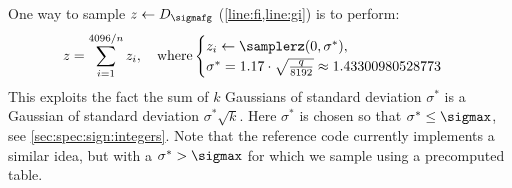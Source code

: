 \begin{algorithm}%
  \caption{$\ntrugen(\phi, q)$ \hfill}\label{alg:ntrugen}
 \begin{algorithmic}[1]
  \label{step:genfg}
  \label{line:sigmafg} 
  \EndFor
  \label{line:fi}
  \label{line:gi}
  \label{step:ntt} 
  \Restart
  \EndIf
  \label{line:gamma}
  \Restart
  \EndIf\label{step:endgenfg}
   
  \label{line:botntrusolve}
  \Restart\label{line:botntrusolverestart}
  \EndIf
  \end{algorithmic}
\end{algorithm}

\newcommand{\sigmastar}{{\sigma^*}}
One way to sample $z \gets D_{\sigmafg}$ (\cref{line:fi,line:gi}) is to perform:
\begin{equation}\label{eq:sigmastar}
z = \sum_{i = 1}^{4096/n} z_i, \quad \text{where} \begin{cases}
z_i \gets \samplerz(0, \sigmastar),\\
\sigmastar = 1.17 \cdot \sqrt\frac{q}{8192} \approx 1.43300980528773
\end{cases}
\end{equation}
This exploits the fact the sum of $k$ Gaussians of standard deviation $\sigmastar$ is a Gaussian of standard deviation $\sigmastar \sqrt{k}$. Here $\sigmastar$ is chosen so that $\sigmastar \leq \sigmax$, see \cref{sec:spec:sign:integers}. Note that the reference code currently implements a similar idea, but with a $\sigmastar > \sigmax$ for which we sample using a precomputed table.

